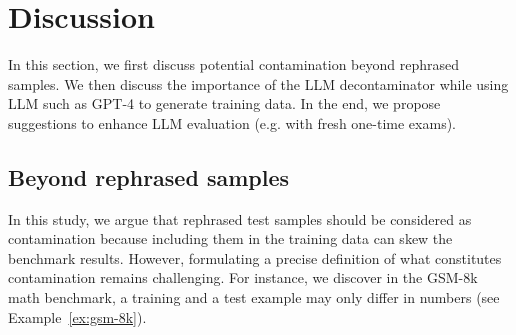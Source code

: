 \section{Discussion}
\label{sec:one-time-exam}

In this section, we first discuss potential contamination beyond rephrased samples.
We then discuss the importance of the LLM decontaminator while using LLM such as GPT-4 to generate training data.
In the end, we propose suggestions to enhance LLM evaluation (e.g. with fresh one-time exams). 


\subsection{Beyond rephrased samples}

In this study, we argue that rephrased test samples should be considered as contamination because including them in the training data can skew the benchmark results.
However, formulating a precise definition of what constitutes contamination remains challenging.
For instance, we discover in the GSM-8k math benchmark, a training and a test example may only differ in numbers (see Example~\ref{ex:gsm-8k}). %

